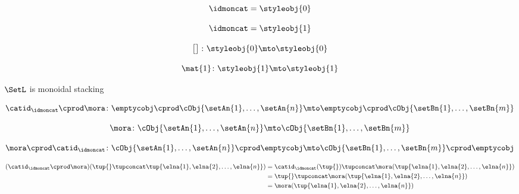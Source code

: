 \begin{forslides}
    \begin{equation}
        \label{eq:parallelism-062}
        \idmoncat = \styleobj{0}
    \end{equation}

    \begin{equation}
        \label{eq:parallelism-063}
        \idmoncat = \styleobj{1}
    \end{equation}

    \begin{equation}
        \label{eq:parallelism-064}
        \begin{bmatrix}\\ \end{bmatrix} \colon \styleobj{0} \mto \styleobj{0}
    \end{equation}

    \begin{equation}
        \label{eq:parallelism-065}
        \mat{ 1 } \colon \styleobj{1} \mto \styleobj{1}
    \end{equation}

    $\SetL$ is monoidal stacking

    \begin{equation}
        \label{eq:parallelism-066}
        \catid_\idmoncat \cprod \mora \colon \emptycobj \cprod \cObj{\setAn{1}, \ldots, \setAn{n}} \mto \emptycobj \cprod \cObj{\setBn{1}, \ldots, \setBn{m}}
    \end{equation}

    \begin{equation}
        \label{eq:parallelism-067}
        \mora \colon \cObj{\setAn{1}, \ldots, \setAn{n}} \mto \cObj{\setBn{1}, \ldots, \setBn{m}}
    \end{equation}

    \begin{equation}
        \label{eq:parallelism-068}
        \mora \cprod \catid_\idmoncat \colon \cObj{\setAn{1}, \ldots, \setAn{n}} \cprod \emptycobj \mto \cObj{\setBn{1}, \ldots, \setBn{m}} \cprod \emptycobj
    \end{equation}

    \begin{align*}
        \label{eq:parallelism-069}
        (\catid_\idmoncat \cprod \mora) (\tup{} \tupconcat \tup{\elna{1}, \elna{2}, \ldots, \elna{n}}) & = \catid_\idmoncat (\tup{}) \tupconcat \mora(\tup{\elna{1}, \elna{2}, \ldots, \elna{n}}) \\ &= \tup{} \tupconcat \mora(\tup{\elna{1}, \elna{2}, \ldots, \elna{n}}) \\
                                                                                                       & = \mora(\tup{\elna{1}, \elna{2}, \ldots, \elna{n}})
    \end{align*}


\end{forslides}
